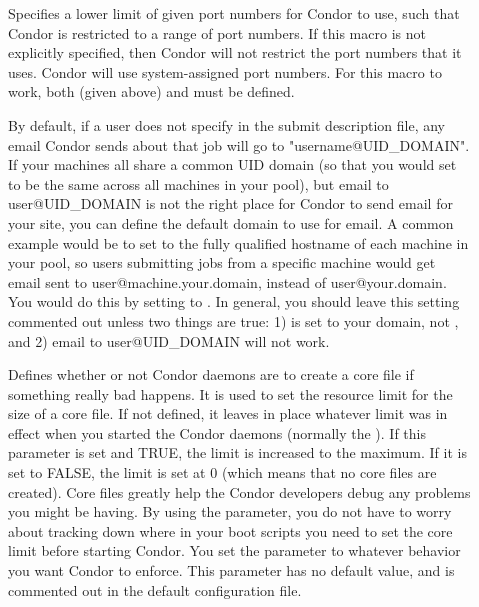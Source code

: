 \begin{description}
\item[] \label{param:LowPort}
  Specifies a lower limit of given port numbers for Condor to use,
  such that Condor is restricted to a range of port numbers.
  If this macro is not explicitly specified, then Condor will
  not restrict the port numbers that it uses. Condor will use
  system-assigned port numbers.
  For this macro to work, both  (given above) and
   must be defined.

\item[] \label{param:EmailDomain}
  By default, if a user does not specify  in the
  submit description file, any email Condor sends about that job will
  go to "username@UID\_DOMAIN".
  If your machines all share a common UID domain (so that you would
  set  to be the same across all machines in your
  pool), but email to user@UID\_DOMAIN is not the right place for
  Condor to send email for your site, you can define the default
  domain to use for email.
  A common example would be to set  to the fully
  qualified hostname of each machine in your pool, so users submitting
  jobs from a specific machine would get email sent to
  user@machine.your.domain, instead of user@your.domain.  
  You would do this by setting  to
  . 
  In general, you should leave this setting commented out unless two
  things are true: 1)  is set to your domain, not
  , and 2) email to user@UID\_DOMAIN will not 
  work. 

\item[] \label{param:CreateCoreFiles}
  Defines whether or not Condor daemons are to
  create a core file if something really bad happens.  It is
  used to set
  the resource limit for the size of a core file.  If not defined,
  it leaves in place whatever limit was in effect
  when you started the Condor daemons (normally the ).
  If this parameter is set and TRUE, the limit is increased to
  the maximum.  If it is set to FALSE, the limit is set at 0
  (which means that no core files are created).  Core files
  greatly help the Condor developers debug any problems you might be
  having.  By using the parameter, you do not have to worry about
  tracking down where in your boot scripts you need to set the core
  limit before starting Condor. You set the parameter
  to whatever behavior you want Condor to enforce.  This parameter has
  no default value, and is commented out in the default configuration file. 


\end{description}
